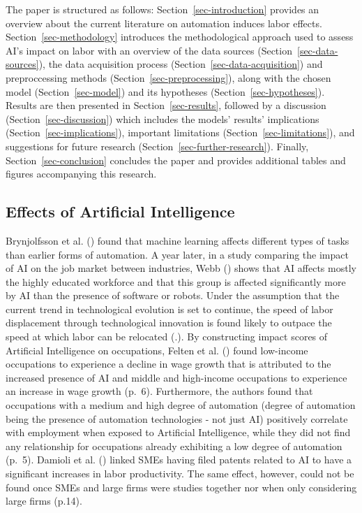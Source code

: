 \documentclass[
  12pt,
  a4paperpaper,
]{article}
\begin{document}
The paper is structured as follows: Section~\ref{sec-introduction}
provides an overview about the current literature on automation induces
labor effects. Section~\ref{sec-methodology} introduces the
methodological approach used to assess AI's impact on labor with an
overview of the data sources (Section~\ref{sec-data-sources}), the data
acquisition process (Section~\ref{sec-data-acquisition}) and
preproccessing methods (Section~\ref{sec-preprocessing}), along with the
chosen model (Section~\ref{sec-model}) and its hypotheses
(Section~\ref{sec-hypotheses}). Results are then presented in
Section~\ref{sec-results}, followed by a discussion
(Section~\ref{sec-discussion}) which includes the models' results'
implications (Section~\ref{sec-implications}), important limitations
(Section~\ref{sec-limitations}), and suggestions for future research
(Section~\ref{sec-further-research}). Finally,
Section~\ref{sec-conclusion} concludes the paper and
 provides additional tables and figures
accompanying this research.

\subsection{Effects of Artificial Intelligence}\label{sec-effects-of-ai}

Brynjolfsson et al. () found that machine learning affects different types of tasks than
earlier forms of automation. A year later, in a study comparing the
impact of AI on the job market between industries, Webb
() shows that AI affects
mostly the highly educated workforce and that this group is affected
significantly more by AI than the presence of software or robots. Under
the assumption that the current trend in technological evolution is set
to continue, the speed of labor displacement through technological
innovation is found likely to outpace the speed at which labor can be
relocated (.). By constructing impact scores of Artificial Intelligence on
occupations, Felten et al. ()
found low-income occupations to experience a decline in wage growth that
is attributed to the increased presence of AI and middle and high-income
occupations to experience an increase in wage growth (p.~6).
Furthermore, the authors found that occupations with a medium and high
degree of automation (degree of automation being the presence of
automation technologies - not just AI) positively correlate with
employment when exposed to Artificial Intelligence, while they did not
find any relationship for occupations already exhibiting a low degree of
automation (p.~5). Damioli et al.
() linked SMEs having
filed patents related to AI to have a significant increases in labor
productivity. The same effect, however, could not be found once SMEs and
large firms were studies together nor when only considering large firms
(p.14).
\end{document}
